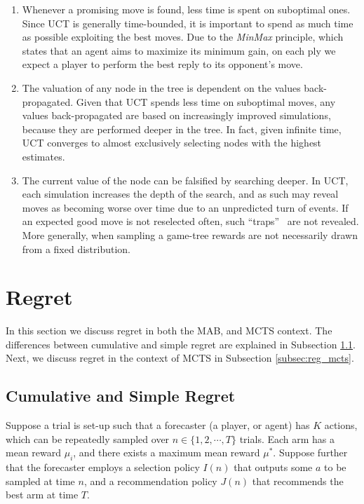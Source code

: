 \documentclass[a4paper]{llncs}
\begin{document}
\begin{enumerate} 

\item Whenever a promising move is found, less time is spent on suboptimal ones. Since UCT is generally time-bounded, it is important to spend as much time as possible exploiting the best moves. Due to the \emph{MinMax} principle, which states that an agent aims to maximize its minimum gain, on each ply we expect a player to perform the best reply to its opponent's move. 

\item The valuation of any node in the tree is dependent on the values back-propagated. Given that UCT spends less time on suboptimal moves, any values back-propagated are based on increasingly improved simulations, because they are performed deeper in the tree. In fact, given infinite time, UCT converges to almost exclusively selecting nodes with the highest estimates.

\item The current value of the node can be falsified by searching deeper. In UCT, each simulation increases the depth of the search, and as such may reveal moves as becoming worse over time due to an unpredicted turn of events. If an expected good move is not reselected often, such ``traps''~\cite{Ramanujan2010a} are not revealed. More generally, when sampling a game-tree rewards are not necessarily drawn from a fixed distribution.
\end{enumerate}

\section{Regret}
\label{sec:regret}
In this section we discuss regret in both the MAB, and MCTS context. The differences between cumulative and simple regret are explained in Subsection \ref{subsec:cumsimregret}. Next, we discuss regret in the context of MCTS in Subsection \ref{subsec:reg_mcts}.

\subsection{Cumulative and Simple Regret}
\label{subsec:cumsimregret}

Suppose a trial is set-up such that a forecaster (a player, or agent) has $K$ actions, which can be repeatedly sampled over $n \in \{ 1, 2, \cdots, T \}$ trials. Each arm has a mean reward $\mu_i$, and there exists a maximum mean reward $\mu^*$. Suppose further that the forecaster employs a selection policy $I(n)$ that outputs some $a$ to be sampled at time $n$, and a recommendation policy $J(n)$ that recommends the best arm at time $T$.
\end{document}
